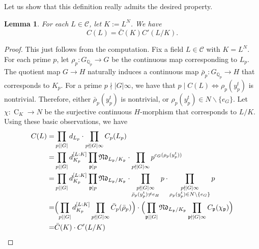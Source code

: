 \documentclass[12pt,a4paper]{amsart}
\numberwithin{equation}{section}%
\theoremstyle{plain}%
\newtheorem{lemma}[theorem]{Lemma}%
\theoremstyle{definition}%
\theoremstyle{remark}%
\begin{document}
    Let us show that this definition really admits the desired property.
    \begin{lemma}
    	For each $L\in\mathcal{C}$, let $K:=L^{N}$.
    	We have
    	\begin{equation*}
    		C(L)=\bar{C}(K)C'(L/K).
    	\end{equation*}
    \end{lemma}
    \begin{proof}%
    	This just follows from the computation.
    	Fix a field $L\in\mathcal{C}$ with $K=L^{N}$.
    	For each prime $p$, let $\rho_{p}:G_{\mathbb{Q}_{p}}\to G$ be the continuous map corresponding to $L_{p}$.
    	The quotient map $G\to H$ naturally induces a continuous map $\bar{\rho}_{p}:G_{\mathbb{Q}_{p}}\to H$ that corresponds to $K_{p}$.
    	For a prime $p\nmid\lvert G\rvert\infty$, we have that $p\mid C(L)\iff \rho_{p}(y_{p}^{t})$ is nontrivial.
    	Therefore, either $\bar{\rho}_{p}(y_{p}^{t})$ is nontrivial, or $\rho_{p}(y_{p}^{t})\in N\backslash\{e_{G}\}$.
    	Let $\chi:\operatorname{C}_{K}\to N$ be the surjective continuous $H$-morphism that corresponds to $L/K$.
    	Using these basic observations, we have
    	\begin{equation*}%
    		\begin{aligned}%
    			C(L)=& \prod_{p\mid\lvert G\rvert}d_{L_{p}}\cdot\prod_{p\nmid\lvert G\rvert\infty}C_{p}(L_{p}) \\%
    			=& \prod_{p\mid\lvert G\rvert}d_{K_{p}}^{[L:K]}\prod_{\mathfrak{p}\mid p}\mathfrak{Nd}_{L_{\mathfrak{p}}/K_{\mathfrak{p}}}%
    			\cdot\prod_{p\nmid\lvert G\rvert\infty}p^{c_{G}(\rho_{p}(y_{p}^{t}))} \\%
    			=& \prod_{p\mid\lvert G\rvert}d_{K_{p}}^{[L:K]}\prod_{\mathfrak{p}\mid p}\mathfrak{Nd}_{L_{\mathfrak{p}}/K_{\mathfrak{p}}}%
    			\cdot\prod_{%
    				\substack{%
    					p\nmid\lvert G\rvert\infty \\%
    					\bar{\rho}_{p}(y_{p}^{t})\neq e_{H}%
    				}%
    			}p%
    			\cdot\prod_{%
    				\substack{%
    					p\nmid\lvert G\rvert\infty \\%
    					\rho_{p}(y_{p}^{t})\in N\backslash\{e_{G}\}%
    				}%
    			}p \\%
    			=& \Bigl(\prod_{p\mid\lvert G\rvert}d_{K_{p}}^{[L:K]}\prod_{p\nmid\lvert G\rvert\infty}\bar{C}_{p}(\bar{\rho}_{p})\Bigr)%
    			\cdot \Bigl(\prod_{\mathfrak{p}\mid\lvert G\rvert}\mathfrak{Nd}_{L_{\mathfrak{p}}/K_{\mathfrak{p}}}\prod_{\mathfrak{p}\nmid\lvert G\rvert\infty}C_{\mathfrak{p}}(\chi_{\mathfrak{p}})\Bigr) \\%
    			=& \bar{C}(K)\cdot C'(L/K)%
    		\end{aligned}
    	\end{equation*}%
    \end{proof}%
\end{document}
